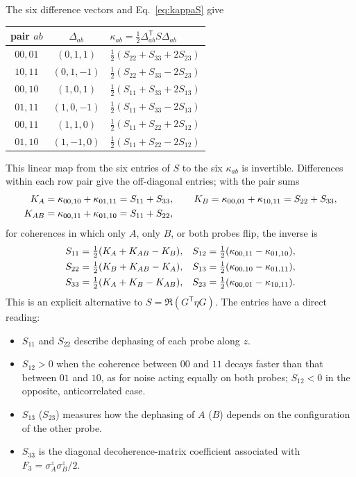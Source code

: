 \documentclass[11pt,a4paper]{article}
\begin{document}
The six difference vectors and Eq.~\eqref{eq:kappaS} give
\begin{center}
\begin{tabular}{@{}ccl@{}}
\toprule
pair $ab$&$\Delta_{ab}$&$\kappa_{ab}=\tfrac12\Delta_{ab}^{\mathsf T}S\Delta_{ab}$\\\midrule
$00,01$&$(0,1,1)$&$\tfrac12(S_{22}+S_{33}+2S_{23})$\\
$10,11$&$(0,1,-1)$&$\tfrac12(S_{22}+S_{33}-2S_{23})$\\
$00,10$&$(1,0,1)$&$\tfrac12(S_{11}+S_{33}+2S_{13})$\\
$01,11$&$(1,0,-1)$&$\tfrac12(S_{11}+S_{33}-2S_{13})$\\
$00,11$&$(1,1,0)$&$\tfrac12(S_{11}+S_{22}+2S_{12})$\\
$01,10$&$(1,-1,0)$&$\tfrac12(S_{11}+S_{22}-2S_{12})$\\\bottomrule
\end{tabular}
\end{center}
This linear map from the six entries of $S$ to the six $\kappa_{ab}$ is
invertible. Differences within each row pair give the off-diagonal
entries; with the pair sums
\begin{align}
 K_A&=\kappa_{00,10}+\kappa_{01,11}=S_{11}+S_{33},\qquad
 K_B=\kappa_{00,01}+\kappa_{10,11}=S_{22}+S_{33},\notag\\
 K_{AB}&=\kappa_{00,11}+\kappa_{01,10}=S_{11}+S_{22},
\end{align}
for coherences in which only $A$, only $B$, or both probes flip, the
inverse is
\begin{align}
 S_{11}&=\tfrac12(K_A+K_{AB}-K_B),&
 S_{12}&=\tfrac12(\kappa_{00,11}-\kappa_{01,10}),\notag\\
 S_{22}&=\tfrac12(K_B+K_{AB}-K_A),&
 S_{13}&=\tfrac12(\kappa_{00,10}-\kappa_{01,11}),
 \label{eq:Sinverse}\\
 S_{33}&=\tfrac12(K_A+K_B-K_{AB}),&
 S_{23}&=\tfrac12(\kappa_{00,01}-\kappa_{10,11}).\notag
\end{align}
This is an explicit alternative to $S=\Re(G^{\mathsf T}\eta G)$.
The entries have a direct reading:
\begin{itemize}
\item $S_{11}$ and $S_{22}$ describe dephasing of each probe along $z$.
\item $S_{12}>0$ when the coherence between $00$ and $11$ decays faster
than that between $01$ and $10$, as for noise acting equally on both
probes; $S_{12}<0$ in the opposite, anticorrelated case.
\item $S_{13}$ ($S_{23}$) measures how the dephasing of $A$ ($B$)
depends on the configuration of the other probe.
\item $S_{33}$ is the diagonal decoherence-matrix coefficient associated
with $F_3=\sigma_A^z\sigma_B^z/2$.
\end{itemize}
\end{document}
